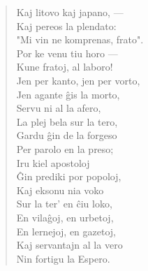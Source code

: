 \begin{verse}
                        Kaj litovo kaj japano, ---\\
                        Kaj pereos la plendato:\\
                        "Mi vin ne komprenas, frato".\\
                        Por ke venu tiu horo ---\\
                        Kune fratoj, al laboro!\\
                        Jen per kanto, jen per vorto,\\
                        Jen agante \^gis la morto,\\
                        Servu ni al la afero,\\
                        La plej bela sur la tero,\\
                        Gardu \^gin de la forgeso\\
                        Per parolo en la preso;\\
                        Iru kiel apostoloj\\
                        \^Gin prediki por popoloj,\\
                        Kaj eksonu nia voko\\
                        Sur la ter' en \^ciu loko,\\
                        En vila\^goj, en urbetoj,\\
                        En lernejoj, en gazetoj,\\
                        Kaj servantajn al la vero\\
                        Nin fortigu la Espero.

\end{verse}


\smallrule{}

